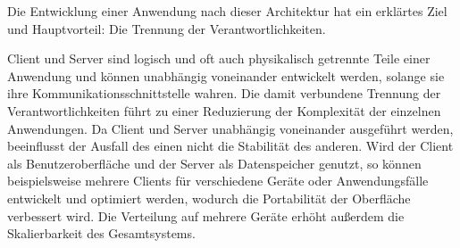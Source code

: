 \par
Die Entwicklung einer Anwendung nach dieser Architektur hat ein erklärtes Ziel und Hauptvorteil: Die Trennung der Verantwortlichkeiten.\cite[vgl.][]{REST}
\par
Client und Server sind logisch und oft auch physikalisch getrennte Teile einer Anwendung und können unabhängig voneinander entwickelt werden, solange sie ihre Kommunikationsschnittstelle wahren.
Die damit verbundene Trennung der Verantwortlichkeiten führt zu einer Reduzierung der Komplexität der einzelnen Anwendungen.
Da Client und Server unabhängig voneinander ausgeführt werden, beeinflusst der Ausfall des einen nicht die Stabilität des anderen.
Wird der Client als Benutzeroberfläche und der Server als Datenspeicher genutzt, so können beispielsweise mehrere Clients für verschiedene Geräte oder Anwendungsfälle entwickelt und optimiert werden, wodurch die Portabilität der Oberfläche verbessert wird.
Die Verteilung auf mehrere Geräte erhöht außerdem die Skalierbarkeit des Gesamtsystems.

